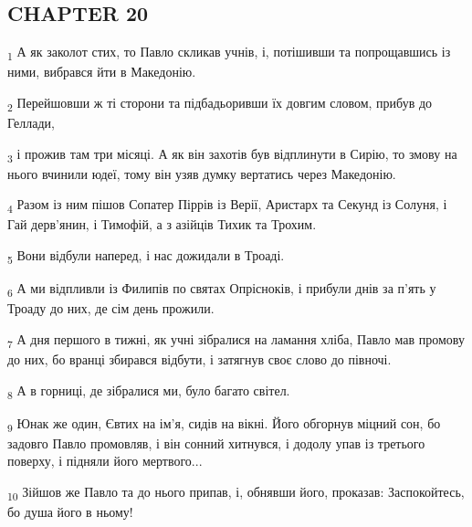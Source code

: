 \subsection{CHAPTER 20}
\begin{tcolorbox}
\textsubscript{1} А як заколот стих, то Павло скликав учнів, і, потішивши та попрощавшись із ними, вибрався йти в Македонію.
\end{tcolorbox}
\begin{tcolorbox}
\textsubscript{2} Перейшовши ж ті сторони та підбадьоривши їх довгим словом, прибув до Геллади,
\end{tcolorbox}
\begin{tcolorbox}
\textsubscript{3} і прожив там три місяці. А як він захотів був відплинути в Сирію, то змову на нього вчинили юдеї, тому він узяв думку вертатись через Македонію.
\end{tcolorbox}
\begin{tcolorbox}
\textsubscript{4} Разом із ним пішов Сопатер Піррів із Верії, Аристарх та Секунд із Солуня, і Гай дерв'янин, і Тимофій, а з азійців Тихик та Трохим.
\end{tcolorbox}
\begin{tcolorbox}
\textsubscript{5} Вони відбули наперед, і нас дожидали в Троаді.
\end{tcolorbox}
\begin{tcolorbox}
\textsubscript{6} А ми відпливли із Филипів по святах Опрісноків, і прибули днів за п'ять у Троаду до них, де сім день прожили.
\end{tcolorbox}
\begin{tcolorbox}
\textsubscript{7} А дня першого в тижні, як учні зібралися на ламання хліба, Павло мав промову до них, бо вранці збирався відбути, і затягнув своє слово до півночі.
\end{tcolorbox}
\begin{tcolorbox}
\textsubscript{8} А в горниці, де зібралися ми, було багато світел.
\end{tcolorbox}
\begin{tcolorbox}
\textsubscript{9} Юнак же один, Євтих на ім'я, сидів на вікні. Його обгорнув міцний сон, бо задовго Павло промовляв, і він сонний хитнувся, і додолу упав із третього поверху, і підняли його мертвого...
\end{tcolorbox}
\begin{tcolorbox}
\textsubscript{10} Зійшов же Павло та до нього припав, і, обнявши його, проказав: Заспокойтесь, бо душа його в ньому!
\end{tcolorbox}

